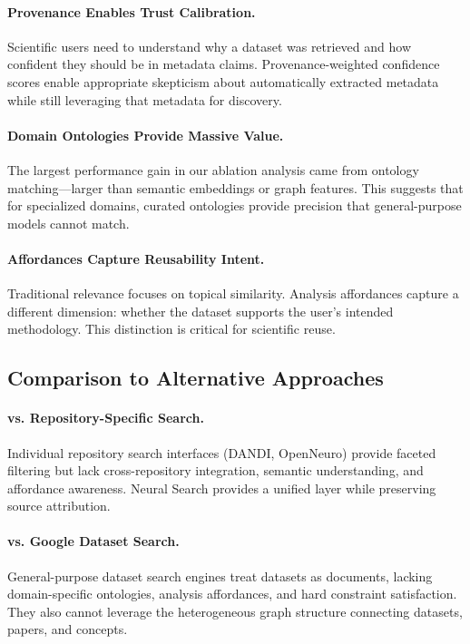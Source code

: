 \documentclass{article}
\theoremstyle{definition}
\begin{document}
\paragraph{Provenance Enables Trust Calibration.} Scientific users need to understand why a dataset was retrieved and how confident they should be in metadata claims. Provenance-weighted confidence scores enable appropriate skepticism about automatically extracted metadata while still leveraging that metadata for discovery.

\paragraph{Domain Ontologies Provide Massive Value.} The largest performance gain in our ablation analysis came from ontology matching---larger than semantic embeddings or graph features. This suggests that for specialized domains, curated ontologies provide precision that general-purpose models cannot match.

\paragraph{Affordances Capture Reusability Intent.} Traditional relevance focuses on topical similarity. Analysis affordances capture a different dimension: whether the dataset supports the user's intended methodology. This distinction is critical for scientific reuse.

\subsection{Comparison to Alternative Approaches}

\paragraph{vs. Repository-Specific Search.} Individual repository search interfaces (DANDI, OpenNeuro) provide faceted filtering but lack cross-repository integration, semantic understanding, and affordance awareness. Neural Search provides a unified layer while preserving source attribution.

\paragraph{vs. Google Dataset Search.} General-purpose dataset search engines treat datasets as documents, lacking domain-specific ontologies, analysis affordances, and hard constraint satisfaction. They also cannot leverage the heterogeneous graph structure connecting datasets, papers, and concepts.
\end{document}
